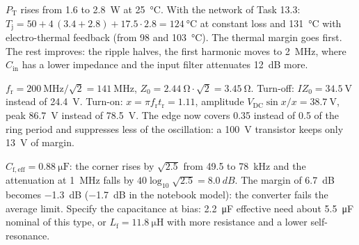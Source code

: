 
\begin{solutionblock}
	$P_\mathrm{T}$ rises from 1.6 to \SI{2.8}{\watt} at \SI{25}{\celsius}. With the network of Task 13.3: $T_\mathrm{j}=50+4\,(3.4+2.8)+17.5\cdot2.8=\SI{124}{\celsius}$ at constant loss and \SI{131}{\celsius} with electro-thermal feedback (from 98 and \SI{103}{\celsius}). The thermal margin goes first. The rest improves: the ripple halves, the first harmonic moves to \SI{2}{\mega\hertz}, where $C_\mathrm{in}$ has a lower impedance and the input filter attenuates \SI{12}{dB} more.
\end{solutionblock}


\begin{solutionblock}
	$f_\mathrm{r}=\SI{200}{\mega\hertz}/\sqrt{2}=\SI{141}{\mega\hertz}$, $Z_0=\SI{2.44}{\ohm}\cdot\sqrt{2}=\SI{3.45}{\ohm}$. Turn-off: $IZ_0=\SI{34.5}{\volt}$ instead of \SI{24.4}{\volt}. Turn-on: $x=\pi f_\mathrm{r}t_\mathrm{r}=1.11$, amplitude $V_\mathrm{DC}\sin x/x=\SI{38.7}{\volt}$, peak \SI{86.7}{\volt} instead of \SI{78.5}{\volt}. The edge now covers 0.35 instead of 0.5 of the ring period and suppresses less of the oscillation: a \SI{100}{\volt} transistor keeps only \SI{13}{\volt} of margin.
\end{solutionblock}


\begin{solutionblock}
	$C_\mathrm{f,eff}=\SI{0.88}{\micro\farad}$: the corner rises by $\sqrt{2.5}$ from 49.5 to \SI{78}{\kilo\hertz} and the attenuation at \SI{1}{\mega\hertz} falls by $40\log_{10}\sqrt{2.5}=\SI{8.0}{dB}$. The margin of \SI{6.7}{dB} becomes \SI{-1.3}{dB} (\SI{-1.7}{dB} in the notebook model): the converter fails the average limit. Specify the capacitance at bias: \SI{2.2}{\micro\farad} effective need about \SI{5.5}{\micro\farad} nominal of this type, or $L_\mathrm{f}=\SI{11.8}{\micro\henry}$ with more resistance and a lower self-resonance.
\end{solutionblock}

